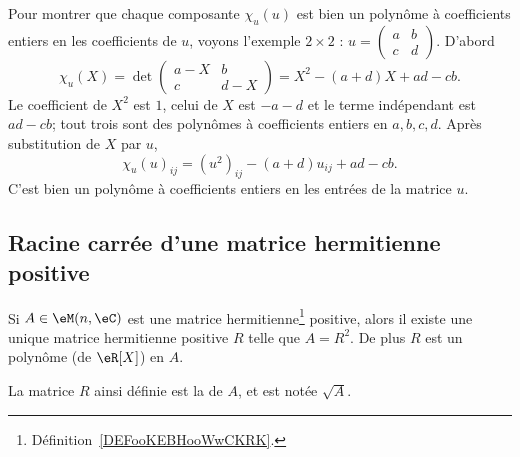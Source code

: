 \begin{example}
	Pour montrer que chaque composante \( \chi_u(u)\) est bien un polynôme à coefficients entiers en les coefficients de \( u\), voyons l'exemple \( 2\times 2\) : \( u=\begin{pmatrix}
		a & b \\
		c & d
	\end{pmatrix}\). D'abord
	\begin{equation}
		\chi_u(X)=\det\begin{pmatrix}
			a-X & b   \\
			c   & d-X
		\end{pmatrix}=X^2-(a+d)X+ad-cb.
	\end{equation}
	Le coefficient de \( X^2\) est \( 1\), celui de \( X\) est \( -a-d\) et le terme indépendant est \( ad-cb\); tout trois sont des polynômes à coefficients entiers en \( a,b,c,d\). Après substitution de \( X\) par \( u\),
	\begin{equation}
		\chi_u(u)_{ij}=(u^2)_{ij}-(a+d)u_{ij}+ad-cb.
	\end{equation}
	C'est bien un polynôme à coefficients entiers en les entrées de la matrice \( u\).
\end{example}

\subsection{Racine carrée d'une matrice hermitienne positive}

\begin{propositionDef}     \label{PropVZvCWn}
	Si \( A\in \eM(n,\eC)\) est une matrice hermitienne\footnote{Définition~\ref{DEFooKEBHooWwCKRK}.} positive, alors il existe une unique matrice hermitienne positive \( R\) telle que \( A=R^2\). De plus \( R\) est un polynôme (de \( \eR[X]\)) en \( A\).

	La matrice \( R\) ainsi définie est la  de \( A\), et est notée \( \sqrt{A}\).
\end{propositionDef}



